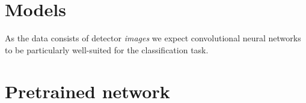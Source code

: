 \section{Models}
As the data consists of detector \textit{images} we expect convolutional
neural networks to be particularly well-suited for the classification task.
\section{Pretrained network}\label{section:method-pretrained}

